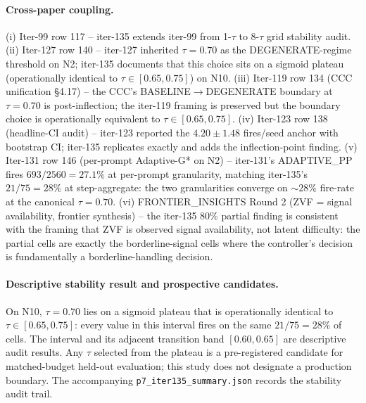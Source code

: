 \paragraph{Cross-paper coupling.}
(i) Iter-99 row 117 -- iter-135 extends iter-99 from 1-$\tau$ to 8-$\tau$
grid stability audit. (ii) Iter-127 row 140 -- iter-127 inherited
$\tau=0.70$ as the DEGENERATE-regime threshold on N2; iter-135
documents that this choice sits on a sigmoid plateau (operationally
identical to $\tau \in [0.65, 0.75]$) on N10. (iii) Iter-119 row 134
(CCC unification §4.17) -- the CCC's BASELINE$\to$DEGENERATE boundary at
$\tau=0.70$ is post-inflection; the iter-119 framing is preserved but
the boundary choice is operationally equivalent to $\tau \in [0.65, 0.75]$.
(iv) Iter-123 row 138 (headline-CI audit) -- iter-123 reported the
$4.20 \pm 1.48$ fires/seed anchor with bootstrap CI; iter-135 replicates
exactly and adds the inflection-point finding. (v) Iter-131 row 146
(per-prompt Adaptive-G* on N2) -- iter-131's ADAPTIVE\_PP fires
$693/2560 = 27.1\%$ at per-prompt granularity, matching iter-135's
$21/75 = 28\%$ at step-aggregate: the two granularities converge on
$\sim 28\%$ fire-rate at the canonical $\tau=0.70$.
(vi) FRONTIER\_INSIGHTS Round 2 (ZVF = signal availability,
frontier synthesis) -- the iter-135 80\% partial finding is consistent
with the framing that ZVF is observed signal availability, not latent
difficulty: the partial cells are exactly the borderline-signal cells
where the controller's decision is fundamentally a borderline-handling
decision.

\paragraph{Descriptive stability result and prospective candidates.}
On N10, $\tau=0.70$ lies on a sigmoid plateau that is operationally identical
to $\tau \in [0.65, 0.75]$: every value in this interval fires on the same
$21/75 = 28\%$ of cells.  The interval and its adjacent transition band
$[0.60,0.65]$ are descriptive audit results.  Any $\tau$ selected from the
plateau is a pre-registered candidate for matched-budget held-out evaluation;
this study does not designate a production boundary.  The accompanying
\texttt{p7\_iter135\_summary.json} records the stability audit trail.


